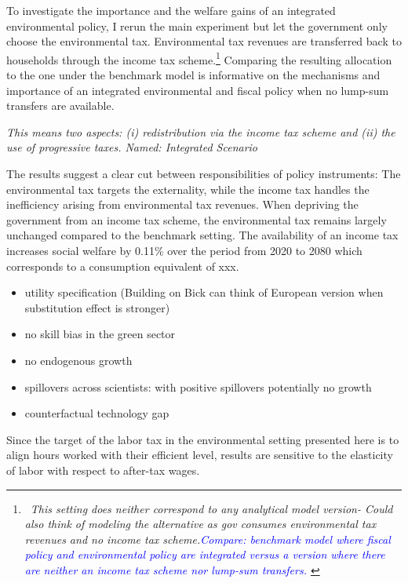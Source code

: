 To investigate the importance and the welfare gains of an integrated environmental policy, I rerun the main experiment but let the government only choose the environmental tax. Environmental tax revenues are transferred back to households through the income tax scheme.\footnote{\ \textit{This setting does neither correspond to any analytical model version- Could also think of modeling the alternative as gov consumes environmental tax revenues  and no income tax scheme.\textcolor{blue}{Compare: benchmark model where fiscal policy and environmental policy are integrated versus a version where there are neither an income tax scheme nor lump-sum transfers. }} 
}
Comparing the resulting allocation to the one under the benchmark model is informative on the mechanisms and importance of an integrated environmental and fiscal policy when no lump-sum transfers are available. 

\textit{ This means two aspects: (i) redistribution via the income tax scheme and (ii) the use of progressive taxes. Named: Integrated Scenario }

The results suggest a clear cut between responsibilities of policy instruments: The environmental tax targets the externality, while the income tax handles the inefficiency arising from environmental tax revenues. When depriving the government from an income tax scheme, the environmental tax remains largely unchanged compared to the benchmark setting. 
The availability of an income tax increases social welfare by 0.11\% over the period from 2020 to 2080 which corresponds to a consumption equivalent of xxx. 


\begin{itemize}
	\item utility specification (Building on Bick can think of European version when substitution effect is stronger)
	\item no skill bias in the green sector
	\item no endogenous growth
	\item spillovers across scientists: with positive spillovers potentially no growth
	\item counterfactual technology gap
\end{itemize}
Since the target of the labor tax in the environmental setting presented here is to align hours worked with their efficient level, results are sensitive to the elasticity of labor with respect to after-tax wages. 
